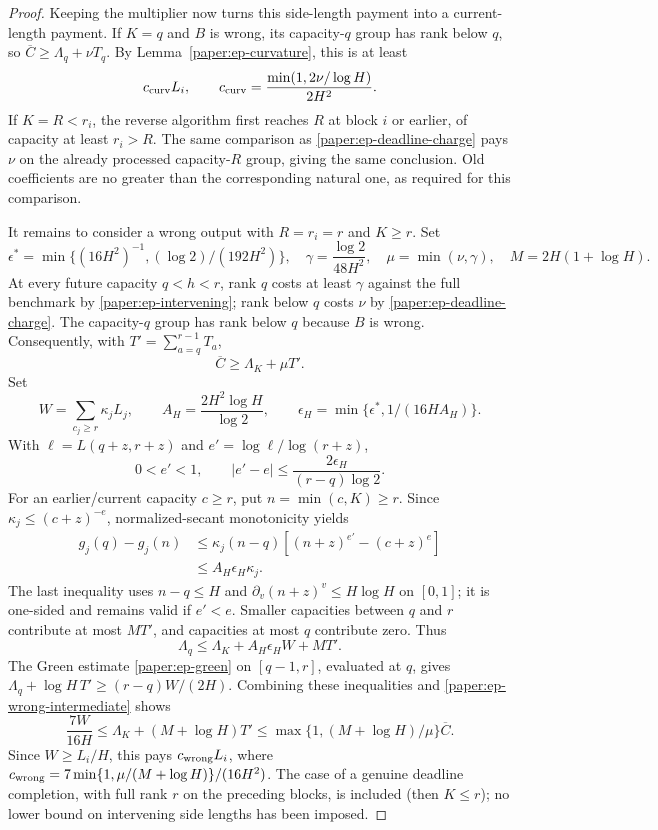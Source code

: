 \begin{proof}
Keeping the multiplier now turns this side-length payment into a
current-length payment.  If $K=q$ and $B$ is wrong, its capacity-$q$
group has rank below $q$, so
$\overline C\geq\Lambda_q+\nu T_q$.  By
Lemma~\ref{paper:ep-curvature}, this is at least
\[
 c_{\rm curv}L_i,\qquad
 c_{\rm curv}=\frac{\min(1,2\nu/\log H)}{2H^2}.
\]
If $K=R<r_i$, the reverse algorithm first reaches $R$ at block $i$
or earlier, of capacity at least $r_i>R$.  The same comparison as
\eqref{paper:ep-deadline-charge} pays $\nu$ on the already processed
capacity-$R$ group, giving the same conclusion.  Old coefficients
are no greater than the corresponding natural one, as required for
this comparison.

It remains to consider a wrong output with $R=r_i=r$ and $K\geq r$.
Set
\[
 \epsilon^*=\min\{(16H^2)^{-1},(\log2)/(192H^2)\},\quad
 \gamma=\frac{\log2}{48H^2},\quad \mu=\min(\nu,\gamma),\quad
 M=2H(1+\log H).
\]
At every future capacity $q<h<r$, rank $q$ costs at least $\gamma$
against the full benchmark by \eqref{paper:ep-intervening}; rank
below $q$ costs $\nu$ by \eqref{paper:ep-deadline-charge}.
The capacity-$q$ group has rank below $q$ because $B$ is wrong.
Consequently, with $T'=\sum_{a=q}^{r-1}T_a$,
\begin{equation}\label{paper:ep-wrong-intermediate}
 \overline C\geq\Lambda_K+\mu T'.
\end{equation}
Set
\[
 W=\sum_{c_j\geq r}\kappa_jL_j,\qquad
 A_H=\frac{2H^2\log H}{\log2},\qquad
 \epsilon_H=\min\{\epsilon^*,1/(16HA_H)\}.
\]
With $\ell=L(q+z,r+z)$ and $e'=\log\ell/\log(r+z)$,
\[
 0<e'<1,\qquad |e'-e|\leq\frac{2\epsilon_H}{(r-q)\log2}.
\]
For an earlier/current capacity $c\geq r$, put $n=\min(c,K)\geq r$.
Since $\kappa_j\leq(c+z)^{-e}$, normalized-secant monotonicity yields
\begin{align*}
 g_j(q)-g_j(n)
 &\leq\kappa_j(n-q)[(n+z)^{e'}-(c+z)^e]\\
 &\leq A_H\epsilon_H\kappa_j.
\end{align*}
The last inequality uses $n-q\leq H$ and
$\partial_v(n+z)^v\leq H\log H$ on $[0,1]$; it is one-sided and
remains valid if $e'<e$.  Smaller capacities between $q$ and $r$
contribute at most $MT'$, and capacities at most $q$ contribute zero.
Thus
\[
 \Lambda_q\leq\Lambda_K+A_H\epsilon_HW+MT'.
\]
The Green estimate \eqref{paper:ep-green} on $[q-1,r]$, evaluated
at $q$, gives $\Lambda_q+\log H\,T'\geq(r-q)W/(2H)$.
Combining these inequalities and \eqref{paper:ep-wrong-intermediate}
shows
\[
 \frac{7W}{16H}\leq\Lambda_K+(M+\log H)T'
 \leq\max\{1,(M+\log H)/\mu\}\overline C.
\]
Since $W\geq L_i/H$, this pays
$c_{\rm wrong}L_i$, where
$c_{\rm wrong}=7\min\{1,\mu/(M+\log H)\}/(16H^2)$.
The case of a genuine deadline completion, with full rank $r$ on
the preceding blocks, is included (then $K\leq r$); no lower bound
on intervening side lengths has been imposed.


\end{proof}
